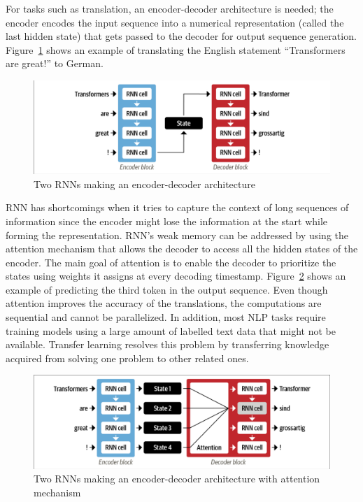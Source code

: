 For tasks such as translation, an encoder-decoder architecture is needed;  the encoder encodes the
input sequence into a numerical representation (called the last hidden state) that gets passed to
the decoder for output sequence generation. Figure~\ref{fig:rnn_encoder_decoder} shows an example of
translating the English statement ``Transformers are great!'' to German. 

\begin{figure}[H]
\begin{center}
  \includegraphics[width=12cm, trim={0.1cm 0.1cm 0.1cm 0.1cm},clip]{./images/encoder-decoder_rnn.png}
\end{center}
\caption{Two RNNs making an encoder-decoder architecture \cite{tunstallNaturalLanguageProcessing2022}}
\label{fig:rnn_encoder_decoder}
\end{figure}

\ac{RNN} has shortcomings when it tries to capture the context of long sequences of information
since the encoder might lose the information at the start while forming the representation.
\ac{RNN}'s weak memory can be addressed by using the attention mechanism that allows the decoder to
access all the hidden states of the encoder. The main goal of attention is to enable the decoder to
prioritize the states using weights it assigns at every decoding timestamp.
Figure~\ref{fig:rnn_encoder_decoder_attention} shows an example of predicting the third token in
the output sequence. Even though attention improves the accuracy of the translations, the
computations are sequential and cannot be parallelized. In addition, most \ac{NLP} tasks require
training models using a large amount of labelled text data that might not be available. Transfer
learning resolves this problem by transferring knowledge acquired from solving one problem to other
related ones.

\begin{figure}[H]
\begin{center}
  \includegraphics[width=12cm,trim={0.1cm 0.1cm 0.1cm 0.1cm},clip]{./images/encoder-decoder_rnn_attention.png}
\end{center}
\caption{Two RNNs making an encoder-decoder architecture with attention mechanism \cite{tunstallNaturalLanguageProcessing2022}}
\label{fig:rnn_encoder_decoder_attention}
\end{figure}

